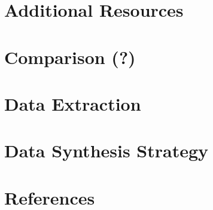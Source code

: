 \documentclass[
]{article}
\begin{document}
\hypertarget{additional-resources}{%
\section{Additional Resources}\label{additional-resources}}

\hypertarget{comparison}{%
\section{Comparison (?)}\label{comparison}}

\hypertarget{data-extraction}{%
\section{Data Extraction}\label{data-extraction}}

\hypertarget{data-synthesis-strategy}{%
\section{Data Synthesis Strategy}\label{data-synthesis-strategy}}

\hypertarget{references}{%
\section{References}\label{references}}
\end{document}
